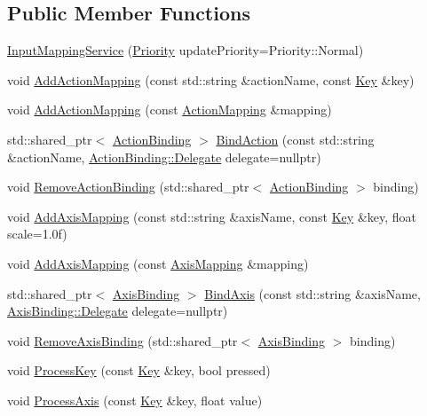 \subsection*{Public Member Functions}
\begin{DoxyCompactItemize}
\item 
\hyperlink{classastu_1_1InputMappingService_a0d099c093d399b34bde9e3baa2e7c3b8}{Input\+Mapping\+Service} (\hyperlink{group__srv__group_gaf164c3f1c393e1f240458ae4fcd484a0}{Priority} update\+Priority=Priority\+::\+Normal)
\item 
void \hyperlink{classastu_1_1InputMappingService_adbb1babb001f3ec6477dd8b75440e0d0}{Add\+Action\+Mapping} (const std\+::string \&action\+Name, const \hyperlink{classastu_1_1Key}{Key} \&key)
\item 
void \hyperlink{classastu_1_1InputMappingService_a0cb02984dc3f9f675375bde109f06537}{Add\+Action\+Mapping} (const \hyperlink{classastu_1_1ActionMapping}{Action\+Mapping} \&mapping)
\item 
std\+::shared\+\_\+ptr$<$ \hyperlink{classastu_1_1ActionBinding}{Action\+Binding} $>$ \hyperlink{classastu_1_1InputMappingService_a419969331a282af1cb7c9bab967dfc3a}{Bind\+Action} (const std\+::string \&action\+Name, \hyperlink{classastu_1_1ActionBinding_ab0e27e5c54f264cb2aa36f65ead9e4ae}{Action\+Binding\+::\+Delegate} delegate=nullptr)
\item 
void \hyperlink{classastu_1_1InputMappingService_a9c516a3fc0689d768b87156e599b9bde}{Remove\+Action\+Binding} (std\+::shared\+\_\+ptr$<$ \hyperlink{classastu_1_1ActionBinding}{Action\+Binding} $>$ binding)
\item 
void \hyperlink{classastu_1_1InputMappingService_a7ef299540b06586bcd12a06a5bd99abc}{Add\+Axis\+Mapping} (const std\+::string \&axis\+Name, const \hyperlink{classastu_1_1Key}{Key} \&key, float scale=1.\+0f)
\item 
void \hyperlink{classastu_1_1InputMappingService_af9135167e139c262b2f63d40d00f5da2}{Add\+Axis\+Mapping} (const \hyperlink{classastu_1_1AxisMapping}{Axis\+Mapping} \&mapping)
\item 
std\+::shared\+\_\+ptr$<$ \hyperlink{classastu_1_1AxisBinding}{Axis\+Binding} $>$ \hyperlink{classastu_1_1InputMappingService_a749a68156e22418458ef0b36a6c6911b}{Bind\+Axis} (const std\+::string \&axis\+Name, \hyperlink{classastu_1_1AxisBinding_a38f398d407de503bd52019e244fa9687}{Axis\+Binding\+::\+Delegate} delegate=nullptr)
\item 
void \hyperlink{classastu_1_1InputMappingService_a453aa6c1e6bc45478d7c988c8a6128f8}{Remove\+Axis\+Binding} (std\+::shared\+\_\+ptr$<$ \hyperlink{classastu_1_1AxisBinding}{Axis\+Binding} $>$ binding)
\item 
void \hyperlink{classastu_1_1InputMappingService_a88ec7a02d2e76d62033491d8c70610fc}{Process\+Key} (const \hyperlink{classastu_1_1Key}{Key} \&key, bool pressed)
\item 
void \hyperlink{classastu_1_1InputMappingService_a1779fb5dee6693257710f887b1287be8}{Process\+Axis} (const \hyperlink{classastu_1_1Key}{Key} \&key, float value)
\end{DoxyCompactItemize}
